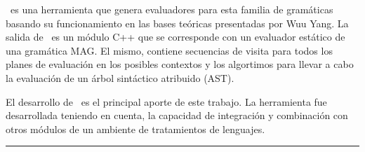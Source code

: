 \documentclass[a4paper,12pt,twoside]{ThesisStyle}
\begin{document}
\begin{vcenterpage}
\maggen\ es una herramienta que genera evaluadores para esta familia de gramáticas basando su funcionamiento en las bases teóricas presentadas por Wuu Yang. La salida de \maggen\ es un módulo C++ que se corresponde con un evaluador estático de una gramática MAG. El mismo, contiene secuencias de visita para todos los planes de evaluación en los posibles contextos y los algortimos para llevar a cabo la evaluación de un árbol sintáctico atribuido (AST).

El desarrollo de \maggen\ es el principal aporte de este trabajo. La herramienta fue desarrollada teniendo en cuenta, la capacidad de integración y combinación con otros módulos de un ambiente de tratamientos de lenguajes.

% 

\noindent\rule[2pt]{\textwidth}{0.5pt}

\end{vcenterpage}

\tableofcontents

\mainmatter

% 
\appendix



\listoffigures

\listoftables

\listofalgorithms

% 
% 



\end{document}
